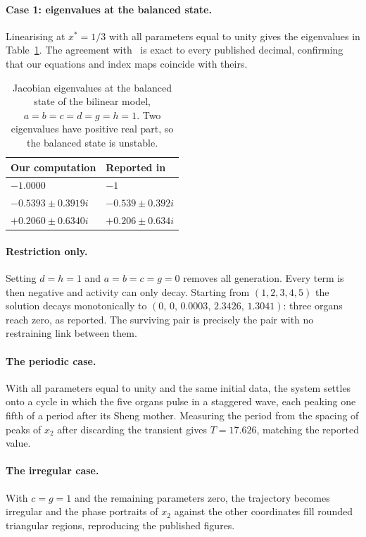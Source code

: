 \documentclass[11pt]{article}
\begin{document}
\paragraph{Case 1: eigenvalues at the balanced state.}
Linearising at $x^\ast=1/3$ with all parameters equal to unity gives the
eigenvalues in Table~\ref{tab:case1}. The agreement with~\cite{Lin2020} is exact
to every published decimal, confirming that our equations and index maps
coincide with theirs.

\begin{table}[!htb]
\centering
\begin{tabular}{ll}
\toprule
Our computation & Reported in~\cite{Lin2020} \\
\midrule
$-1.0000$            & $-1$ \\
$-0.5393\pm 0.3919i$ & $-0.539\pm0.392i$ \\
$+0.2060\pm 0.6340i$ & $+0.206\pm0.634i$ \\
\bottomrule
\end{tabular}
\caption{Jacobian eigenvalues at the balanced state of the bilinear model,
$a=b=c=d=g=h=1$. Two eigenvalues have positive real part, so the balanced state
is unstable.}
\label{tab:case1}
\end{table}

\paragraph{Restriction only.}
Setting $d=h=1$ and $a=b=c=g=0$ removes all generation. Every term is then
negative and activity can only decay. Starting from $(1,2,3,4,5)$ the solution
decays monotonically to $(0,\,0,\,0.0003,\,2.3426,\,1.3041)$: three organs reach
zero, as reported. The surviving pair is precisely the pair with no restraining
link between them.

\paragraph{The periodic case.}
With all parameters equal to unity and the same initial data, the system settles
onto a cycle in which the five organs pulse in a staggered wave, each peaking one
fifth of a period after its Sheng mother. Measuring the period from the spacing
of peaks of $x_2$ after discarding the transient gives $T=17.626$, matching the
reported value.

\paragraph{The irregular case.}
With $c=g=1$ and the remaining parameters zero, the trajectory becomes
irregular and the phase portraits of $x_2$ against the other coordinates fill
rounded triangular regions, reproducing the published figures.
\end{document}
